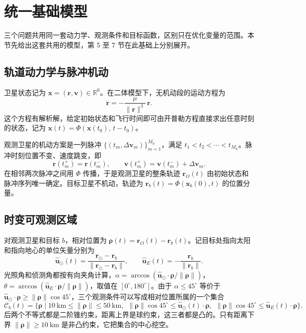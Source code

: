 \clearpage
\section{统一基础模型}

三个问题共用同一套动力学、观测条件和目标函数，区别只在优化变量的范围。本节先给出这套共用的模型，第 5 至 7 节在此基础上分别展开。

\subsection{轨道动力学与脉冲机动}

卫星状态记为 $\bm x = (\bm r, \bm v) \in \mathbb R^6$。在二体模型下，无机动段的运动方程为
\begin{equation}
  \ddot{\bm r} = -\frac{\mu}{\|\bm r\|^3}\,\bm r .
  \label{eq:twobody}
\end{equation}
这个方程有解析解，给定初始状态和飞行时间即可由开普勒方程直接求出任意时刻的状态，记为 $\bm x(t) = \Phi(\bm x(t_0),\, t - t_0)$。

观测卫星的机动方案是一列脉冲 $\{(t_m, \Delta\bm v_m)\}_{m=1}^{M_{\mathrm{b}}}$，满足 $t_1 < t_2 < \cdots < t_{M_{\mathrm{b}}}$。脉冲时刻位置不变、速度跳变，即
\begin{equation}
  \bm r(t_m^+) = \bm r(t_m^-), \qquad \bm v(t_m^+) = \bm v(t_m^-) + \Delta\bm v_m .
  \label{eq:impulse}
\end{equation}
在相邻两次脉冲之间用 $\Phi$ 传播，于是观测卫星的整条轨迹 $\bm r_O(t)$ 由初始状态和脉冲序列唯一确定。目标卫星不机动，轨迹为 $\bm r_b(t) = \Phi(\bm x_b(0), t)$ 的位置分量。

\subsection{时变可观测区域}

对观测卫星和目标 $b$，相对位置为 $\bm\rho(t) = \bm r_O(t) - \bm r_b(t)$。记目标处指向太阳和指向地心的单位矢量分别为
\begin{equation}
  \hat{\bm u}_\odot(t) = \frac{\bm r_\odot - \bm r_b}{\|\bm r_\odot - \bm r_b\|}, \qquad
  \hat{\bm u}_E(t) = -\frac{\bm r_b}{\|\bm r_b\|} .
  \label{eq:unitvec}
\end{equation}
光照角和侦测角都按有向夹角计算，$\alpha = \arccos(\hat{\bm u}_\odot\cdot\bm\rho/\|\bm\rho\|)$，$\theta = \arccos(\hat{\bm u}_E\cdot\bm\rho/\|\bm\rho\|)$，取值在 $[0^\circ, 180^\circ]$。由于 $\alpha \le 45^\circ$ 等价于 $\hat{\bm u}_\odot\cdot\bm\rho \ge \|\bm\rho\|\cos 45^\circ$，三个观测条件可以写成相对位置所属的一个集合
\begin{equation}
  \mathcal C_b(t) = \Big\{\bm\rho \;\Big|\; 10~\mathrm{km} \le \|\bm\rho\| \le 50~\mathrm{km},\ \
  \|\bm\rho\|\cos 45^\circ \le \hat{\bm u}_\odot(t)\cdot\bm\rho,\ \
  \|\bm\rho\|\cos 45^\circ \le \hat{\bm u}_E(t)\cdot\bm\rho \Big\} .
  \label{eq:feasset}
\end{equation}
后两个不等式都是二阶锥约束，距离上界是球约束，这三者都是凸的。只有距离下界 $\|\bm\rho\| \ge 10~\mathrm{km}$ 是非凸约束，它把集合的中心挖空。

